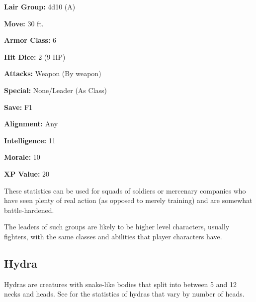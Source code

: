 \begin{multicols*}{2}
{\textbf{Lair Group:} 4d10 (A)

\textbf{Move:} 30 ft.

\textbf{Armor Class:} 6

\textbf{Hit Dice:} 2 (9 HP)

\textbf{Attacks:} Weapon (By weapon)

\textbf{Special:} None/Leader (As Class)

\textbf{Save:} F1

\textbf{Alignment:} Any

\textbf{Intelligence:} 11

\textbf{Morale:} 10

\textbf{XP Value:} 20}

These statistics can be used for squads of soldiers or mercenary companies who have seen plenty of real action (as opposed to merely training) and are somewhat battle-hardened.

The leaders of such groups are likely to be higher level characters, usually fighters, with the same classes and abilities that player characters have.

\subsection{Hydra}

Hydras are creatures with snake-like bodies that split into between 5 and 12 necks and heads. See  for the statistics of hydras that vary by number of heads.


\end{multicols*}
